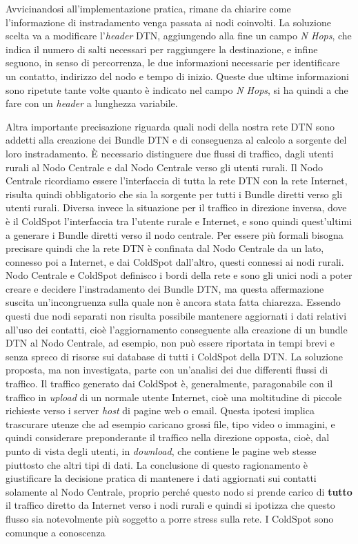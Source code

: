 \documentclass[12pt,a4paper,oneside]{book}
\begin{document}
		Avvicinandosi all'implementazione pratica, rimane da chiarire come l'informazione di instradamento venga passata ai nodi coinvolti. La soluzione scelta va a modificare l'{\it header} DTN, aggiungendo alla fine un campo \emph{N Hops}, che indica il numero di salti necessari per raggiungere la destinazione, e infine seguono, in senso di percorrenza, le due informazioni necessarie per identificare un contatto, indirizzo del nodo e tempo di inizio. Queste due ultime informazioni sono ripetute tante volte quanto è indicato nel campo \emph{N Hops}, si ha quindi a che fare con un {\it header} a lunghezza variabile.
		
		
		Altra importante precisazione riguarda quali nodi della nostra rete DTN sono addetti alla creazione dei Bundle DTN e di conseguenza al calcolo a sorgente del loro instradamento. \`E necessario distinguere due flussi di traffico, dagli utenti rurali al Nodo Centrale e dal Nodo Centrale verso gli utenti rurali. Il Nodo Centrale ricordiamo essere l'interfaccia di tutta la rete DTN con la rete Internet, risulta quindi obbligatorio che sia la sorgente per tutti i Bundle diretti verso gli utenti rurali. Diversa invece la situazione per il traffico in direzione inversa, dove è il ColdSpot l'interfaccia tra l'utente rurale e Internet, e sono quindi quest'ultimi a generare i Bundle diretti verso il nodo centrale. Per essere più formali bisogna precisare quindi che la rete DTN è confinata dal Nodo Centrale da un lato, connesso poi a Internet, e dai ColdSpot dall'altro, questi connessi ai nodi rurali. Nodo Centrale e ColdSpot definisco i bordi della rete e sono gli unici nodi a poter creare e decidere l'instradamento dei Bundle DTN, ma questa affermazione suscita un'incongruenza sulla quale non è ancora stata fatta chiarezza. Essendo questi due nodi separati non risulta possibile mantenere aggiornati i dati relativi all'uso dei contatti, cioè l'aggiornamento conseguente alla creazione di un bundle DTN al Nodo Centrale, ad esempio, non può essere riportata in tempi brevi e senza spreco di risorse sui database di tutti i ColdSpot della DTN. La soluzione proposta, ma non investigata, parte con un'analisi dei due differenti flussi di traffico. Il traffico generato dai ColdSpot è, generalmente, paragonabile con il traffico in {\it upload} di un normale utente Internet, cioè una moltitudine di piccole richieste verso i server {\it host} di pagine web o email. Questa ipotesi implica trascurare utenze che ad esempio caricano grossi file, tipo video o immagini, e quindi considerare preponderante il traffico nella direzione opposta, cioè, dal punto di vista degli utenti, in {\it download}, che contiene le pagine web stesse piuttosto che altri tipi di dati. La conclusione di questo ragionamento è giustificare la decisione pratica di mantenere i dati aggiornati sui contatti solamente al Nodo Centrale, proprio perché questo nodo si prende carico di {\bf tutto} il traffico diretto da Internet verso i nodi rurali e quindi si ipotizza che questo flusso sia notevolmente più soggetto a porre stress sulla rete. I ColdSpot sono comunque a conoscenza 
\end{document}
